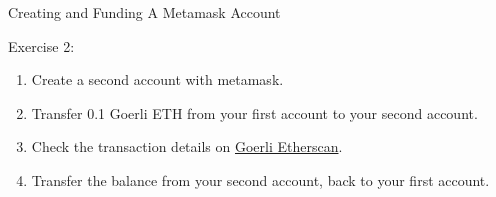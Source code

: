 \documentclass[handout]{beamer}
\begin{document}
\begin{frame}{Creating and Funding A Metamask Account}

	\begin{exercise}{Exercise 2:}
		\begin{enumerate}
			\item Create a second account with metamask.
			\item Transfer 0.1 Goerli ETH from your first account to your second account.
			\item Check the transaction details on \link \href{https://goerli.etherscan.io/}{Goerli Etherscan}.
			\item Transfer the balance from your second account, back to your first account. 
		\end{enumerate}
	\end{exercise}	
\end{frame}
\end{document}
